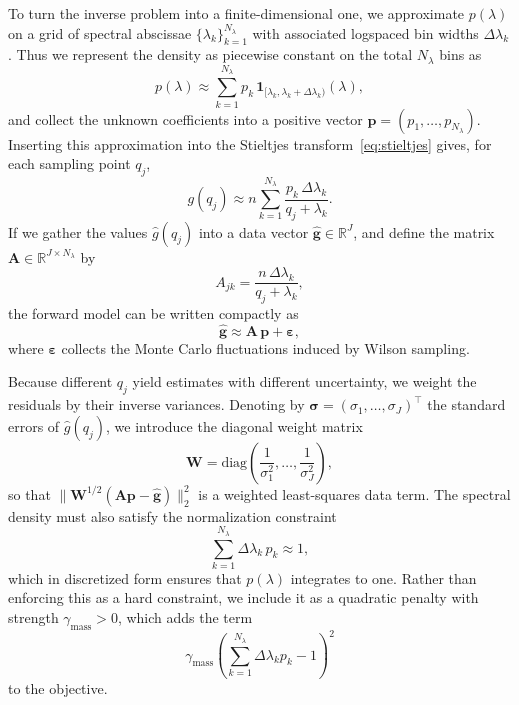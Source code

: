 \documentclass[10pt,aps,pre,twocolumn,nofootinbib,superscriptaddress,longbibliography]{revtex4-2}
\newcommand{\bsigma}{\boldsymbol \sigma}
\newcommand{\bA}{\mathbf{A}}
\newcommand{\bW}{\mathbf{W}}
\begin{document}
To turn the inverse problem into a finite-dimensional one, we approximate $p(\lambda)$ on a grid of spectral abscissae $\{\lambda_k\}_{k=1}^{N_\lambda}$ with associated logspaced bin widths $\Delta\lambda_k$.
Thus we represent the density as piecewise constant on the total $N_\lambda$ bins as
\begin{equation}
  p(\lambda) \approx \sum_{k=1}^{N_\lambda} p_k\,\mathbf{1}_{[\lambda_k,\lambda_k+\Delta\lambda_k)}(\lambda),
\end{equation}
and collect the unknown coefficients into a positive vector $\mathbf{p}=(p_1,\ldots,p_{N_\lambda})$.
Inserting this approximation into the Stieltjes transform~\ref{eq:stieltjes} gives, for each sampling point $q_j$,
\begin{equation}
  g(q_j) \approx n \sum_{k=1}^{N_\lambda}
    \frac{p_k \,\Delta\lambda_k}{q_j + \lambda_k}.
\end{equation}
If we gather the values $\hat g(q_j)$ into a data vector $\hat{\mathbf{g}}\in\mathbb{R}^J$, and define the matrix $\bA\in\mathbb{R}^{J\times N_\lambda}$ by
\begin{equation}
  A_{jk} = \frac{n\,\Delta\lambda_k}{q_j+\lambda_k},
\end{equation}
the forward model can be written compactly as
\begin{equation}
  \hat{\mathbf{g}} \approx \bA\,\mathbf{p} + \boldsymbol{\varepsilon},
\end{equation}
where $\boldsymbol{\varepsilon}$ collects the Monte Carlo fluctuations induced by Wilson sampling.

Because different $q_j$ yield estimates with different uncertainty, we weight the residuals by their inverse variances. Denoting by $\bsigma=(\sigma_1,\ldots,\sigma_J)^\top$ the standard errors of $\hat g(q_j)$, we introduce the diagonal weight matrix
\begin{equation}
\bW = \mathrm{diag}\!\left(\frac{1}{\sigma_1^2},\ldots,\frac{1}{\sigma_J^2}\right),
\end{equation}
so that $\|\bW^{1/2}(\bA\mathbf{p}-\hat{\mathbf{g}})\|_2^2$ is a weighted least-squares data term.
The spectral density must also satisfy the normalization constraint
\begin{equation}
  \sum_{k=1}^{N_\lambda} \Delta\lambda_k\,p_k \approx 1,
\end{equation}
which in discretized form ensures that $p(\lambda)$ integrates to one. 
Rather than enforcing this as a hard constraint, we include it as a quadratic penalty with strength $\gamma_{\mathrm{mass}}>0$, which adds the term
\begin{equation}
\gamma_{\mathrm{mass}}\left(\sum_{k=1}^{N_\lambda} \Delta\lambda_k p_k - 1\right)^2
\end{equation}
to the objective. 
\end{document}
